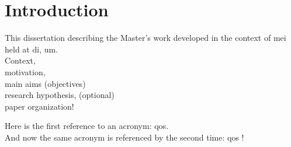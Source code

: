\chapter{Introduction}

    This dissertation describing the  Master's work developed in the context of 
    \gls{mei} held at \gls{di}, \gls{um}.\\
    Context,\\ motivation,\\ main aims	(objectives) \\ research hypothesis, (optional) \\ paper organization!
    
    Here is the first reference to an acronym: \gls{qos}.\\
    And now the same acronym is referenced by the second time: 	\gls{qos} !